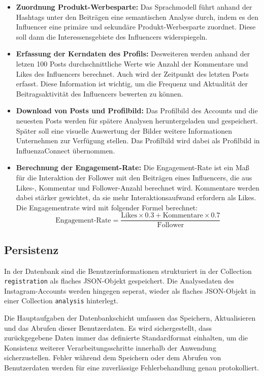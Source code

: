 \documentclass[conference,a4paper,flushend]{cs-techrep}
\begin{document}
\begin{itemize}

\item{\textbf{Zuordnung Produkt-Werbesparte:} Das Sprachmodell führt anhand der Hashtags unter den Beiträgen eine semantischen Analyse durch, indem es den Influencer eine primäre und sekundäre Produkt-Werbesparte zuordnet. Diese soll dann die Interessensgebiete des Influencers widerspiegeln.}

\item{\textbf{Erfassung der Kerndaten des Profils:} Desweiteren werden anhand der letzen 100 Posts durchschnittliche Werte wie Anzahl der Kommentare und Likes des Influencers berechnet. Auch wird der Zeitpunkt des letzten Posts erfasst. Diese Information ist wichtig, um die Frequenz und Aktualität der Beitragsaktivität des Influencers bewerten zu können.}

\item{\textbf{Download von Posts und Profilbild:} Das Profilbild des Accounts und die neuesten Posts werden für spätere Analysen heruntergeladen und gespeichert. Später soll eine visuelle Auswertung der Bilder weitere Informationen Unternehmen zur Verfügung stellen. Das Profilbild wird dabei als Profilbild in InfluenzaConnect übernommen. }

\item{\textbf{Berechnung der Engagement-Rate:} Die Engagement-Rate ist ein Maß für die Interaktion der Follower mit den Beiträgen eines Influencers, die aus Likes-, Kommentar und Follower-Anzahl berechnet wird. Kommentare werden dabei stärker gewichtet, da sie mehr Interaktionsaufwand erfordern als Likes. Die Engagementrate wird mit folgender Formel berechnet: \[
\text{Engagement-Rate} = \frac{\text{Likes} \times 0.3 + \text{Kommentare} \times 0.7}{\text{Follower}} \] }
\end{itemize}



\subsection{Persistenz}

In der Datenbank sind die Benutzerinformationen strukturiert in der Collection \texttt{registration} als flaches JSON-Objekt gespeichert. Die Analysedaten des Instagram-Accounts werden hingegen seperat, wieder als flaches JSON-Objekt in einer Collection \texttt{analysis} hinterlegt. 

Die Hauptaufgaben der Datenbankschicht umfassen das Speichern, Aktualisieren und das Abrufen dieser Benutzerdaten. Es wird sichergestellt, dass zurückgegebene Daten immer das definierte Standardformat einhalten, um die Konsistenz weiterer Verarbeitungsschritte innerhalb der Anwendung sicherzustellen. Fehler während dem Speichern oder dem Abrufen von Benutzerdaten werden für eine zuverlässige Fehlerbehandlung genau protokolliert.
\end{document}
